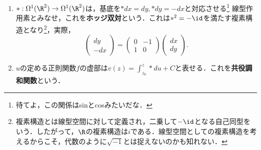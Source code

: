 \documentclass[uplatex, dvipdfmx]{jsreport}
\begin{document}
\begin{definition}\mbox{}
    \begin{enumerate}
        \item 
    $*:\Omega^1(\R^2)\to\Omega^1(\R^2)$は，基底を$*dx=dy,*dy=-dx$と対応させる\footnote{待てよ，この関係はsinとcosみたいだな．}
    線型作用素とみなせ，これを\textbf{ホッジ双対}という．これは$*^2=-\id$を満たす複素構造となり\footnote{複素構造とは線型空間に対して定義され，二乗して$-\id$となる自己同型をいう．したがって，$\R$の複素構造は$i$である．線型空間としての複素構造を考えるからこそ，代数のように$\sqrt{-1}$とは捉えないのかも知れない．}，実際，
    \[\begin{pmatrix}dy\\-dx\end{pmatrix}=\begin{pmatrix}0&-1\\1&0\end{pmatrix}\begin{pmatrix}dx\\dy\end{pmatrix}.\]
    \item $u$の定める正則関数$f$の虚部は$v(z)=\int^z_{z_0}*du+C$と表せる．これを\textbf{共役調和関数}という．
    \end{enumerate}
\end{definition}
\end{document}

